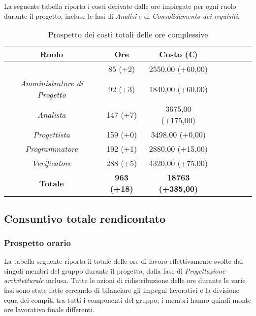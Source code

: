 La seguente tabella riporta i costi derivate dalle ore impiegate per ogni ruolo durante il progetto, incluse le fasi di \textit{Analisi} e di \textit{Consolidamento dei requisiti}.

\begin{table}[H]
		\begin{center}
			\setlength{\aboverulesep}{0pt}
			\setlength{\belowrulesep}{0pt}
			\setlength{\extrarowheight}{.75ex}
			\begin{tabular}{ c c c c c c c c }
				\rowcolor{AzzurroGruppo!30} 
				\textbf{Ruolo} & \textbf{Ore} & \textbf{Costo (\euro{})}\\
				\toprule
				\RdP{}   & 85 (+2) & 2550,00 (+60,00)\\
				\textit{Amministratore di Progetto} & 92 (+3) & 1840,00 (+60,00) \\
				\textit{Analista}       & 147 (+7) & 3675,00 (+175,00) \\
				\textit{Progettista}    & 159 (+0) & 3498,00 (+0,00) \\
				\textit{Programmatore}  & 192 (+1) & 2880,00 (+15,00) \\
				\textit{Verificatore}   & 288 (+5) & 4320,00 (+75,00)\\
				\textbf{Totale} & \textbf{963 (+18)} & \textbf{18763 (+385,00)} \\
				\bottomrule
			\end{tabular}
			\caption{Prospetto dei costi totali delle ore complessive}
		\end{center}
	\end{table}
	
\subsection{Consuntivo totale rendicontato}

\subsubsection{Prospetto orario}
La tabella seguente riporta il totale delle ore di lavoro effettivamente svolte dai singoli membri del gruppo durante il progetto, dalla fase di \textit{Progettazione architetturale} inclusa. Tutte le azioni di ridistribuzione delle ore durante le varie fasi sono state fatte cercando di bilanciare gli impegni lavorativi e la divisione equa dei compiti tra tutti i componenti del gruppo; i membri hanno quindi monte ore lavorativo finale differenti.

